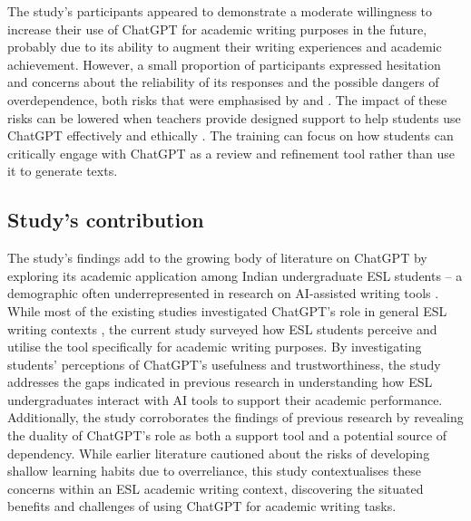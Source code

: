 \documentclass[english]{textolivre}
\begin{document}
The study’s participants appeared to demonstrate a moderate willingness to increase their use of ChatGPT for academic writing purposes in the future, probably due to its ability to augment their writing experiences and academic achievement. However, a small proportion of participants expressed hesitation and concerns about the reliability of its responses and the possible dangers of overdependence, both risks that were emphasised by \textcite{higgs2024} and \textcite{mogavi2024}. The impact of these risks can be lowered when teachers provide designed support to help students use ChatGPT effectively and ethically \cite{teng2024a}. The training can focus on how students can critically engage with ChatGPT as a review and refinement tool rather than use it to generate texts.

\subsection{Study’s contribution}
The study’s findings add to the growing body of literature on ChatGPT by exploring its academic application among Indian undergraduate ESL students -- a demographic often underrepresented in research on AI-assisted writing tools \cite{mahapatra2024}. While most of the existing studies investigated ChatGPT’s role in general ESL writing contexts \cite{al-alami2024, allen2024, teng2024b}, the current study surveyed how ESL students perceive and utilise the tool specifically for academic writing purposes. By investigating students’ perceptions of ChatGPT’s usefulness and trustworthiness, the study addresses the gaps indicated in previous research \cite{mahapatra2024, teng2024a} in understanding how ESL undergraduates interact with AI tools to support their academic performance. Additionally, the study corroborates the findings of previous research \cite{abusaaleek2024, bekturova2025, mogavi2024, teng2024b, yuan2024} by revealing the duality of ChatGPT’s role as both a support tool and a potential source of dependency. While earlier literature \cite{higgs2024, mogavi2024, shoufan2023, szabo2024, yuan2024} cautioned about the risks of developing shallow learning habits due to overreliance, this study contextualises these concerns within an ESL academic writing context, discovering the situated benefits and challenges of using ChatGPT for academic writing tasks.
\end{document}

